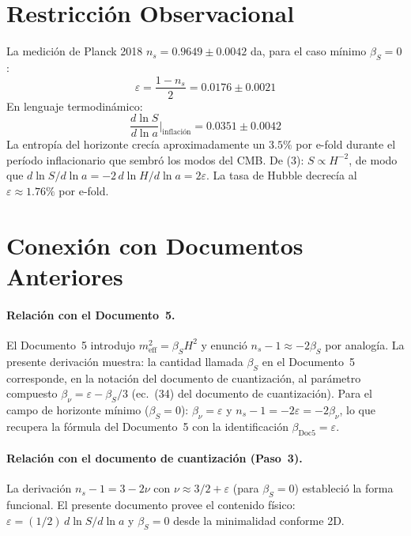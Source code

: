 \documentclass[12pt,a4paper]{article}
\begin{document}
\section{Restricción Observacional}

La medición de Planck 2018 $n_s = 0.9649 \pm 0.0042$ da, para el caso mínimo $\beta_S = 0$:
\begin{equation}
\varepsilon = \frac{1 - n_s}{2} = 0.0176 \pm 0.0021 \tag{20}
\end{equation}
En lenguaje termodinámico:
\begin{equation}
\frac{d\ln S}{d\ln a}\bigg|_\text{inflación} = 0.0351 \pm 0.0042 \tag{21}
\end{equation}
La entropía del horizonte crecía aproximadamente un $3.5\%$ por e-fold durante el período inflacionario que sembró los modos del CMB. De (3): $S \propto H^{-2}$, de modo que $d\ln S/d\ln a = -2\, d\ln H/d\ln a = 2\varepsilon$. La tasa de Hubble decrecía al $\varepsilon \approx 1.76\%$ por e-fold.

\section{Conexión con Documentos Anteriores}

\paragraph{Relación con el Documento~5.}
El Documento~5 introdujo $m_\text{eff}^2 = \beta_S H^2$ y enunció $n_s - 1 \approx -2\beta_S$ por analogía. La presente derivación muestra: la cantidad llamada $\beta_S$ en el Documento~5 corresponde, en la notación del documento de cuantización, al parámetro compuesto $\beta_\nu = \varepsilon - \beta_S/3$ (ec.~(34) del documento de cuantización). Para el campo de horizonte mínimo ($\beta_S = 0$): $\beta_\nu = \varepsilon$ y $n_s - 1 = -2\varepsilon = -2\beta_\nu$, lo que recupera la fórmula del Documento~5 con la identificación $\beta_\text{Doc5} = \varepsilon$.

\paragraph{Relación con el documento de cuantización (Paso~3).}
La derivación $n_s - 1 = 3 - 2\nu$ con $\nu \approx 3/2 + \varepsilon$ (para $\beta_S = 0$) estableció la forma funcional. El presente documento provee el contenido físico: $\varepsilon = (1/2)\, d\ln S/d\ln a$ y $\beta_S = 0$ desde la minimalidad conforme 2D.
\end{document}
